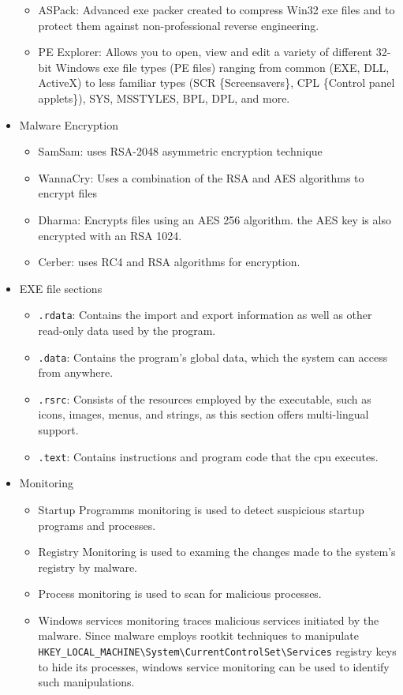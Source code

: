\begin{itemize}
\begin{itemize}
        \item ASPack: Advanced exe packer created to compress Win32 exe files and to protect them against non-professional reverse engineering.
        \item PE Explorer: Allows you to open, view and edit a variety of different 32-bit Windows exe file types (PE files) ranging from common (EXE, DLL, ActiveX) to less familiar types (SCR \{Screensavers\}, CPL \{Control panel applets\}), SYS, MSSTYLES, BPL, DPL, and more.
    \end{itemize}
    \item Malware Encryption
    \begin{itemize}
        \item SamSam: uses RSA-2048 asymmetric encryption technique
        \item WannaCry: Uses a combination of the RSA and AES algorithms to encrypt files
        \item Dharma: Encrypts files using an AES 256 algorithm. the AES key is also encrypted with an RSA 1024.
        \item Cerber: uses RC4 and RSA algorithms for encryption.
    \end{itemize}
    \item EXE file sections
    \begin{itemize}
        \item \verb|.rdata|: Contains the import and export information as well as other read-only data used by the program.
        \item \verb|.data|: Contains the program's global data, which the system can access from anywhere.
        \item \verb|.rsrc|: Consists of the resources employed by the executable, such as icons, images, menus, and strings, as this section offers multi-lingual support.
        \item \verb|.text|: Contains instructions and program code that the cpu executes.
    \end{itemize}
    \item Monitoring
    \begin{itemize}
        \item Startup Programms monitoring is used to detect suspicious startup programs and processes.
        \item Registry Monitoring is used to examing the changes made to the system's registry by malware.
        \item Process monitoring is used to scan for malicious processes.
        \item Windows services monitoring traces malicious services initiated by the malware. Since malware employs rootkit techniques to manipulate \verb|HKEY_LOCAL_MACHINE\System\CurrentControlSet\Services| registry keys to hide its processes, windows service monitoring can be used to identify such manipulations.
    \end{itemize}
\end{itemize}

